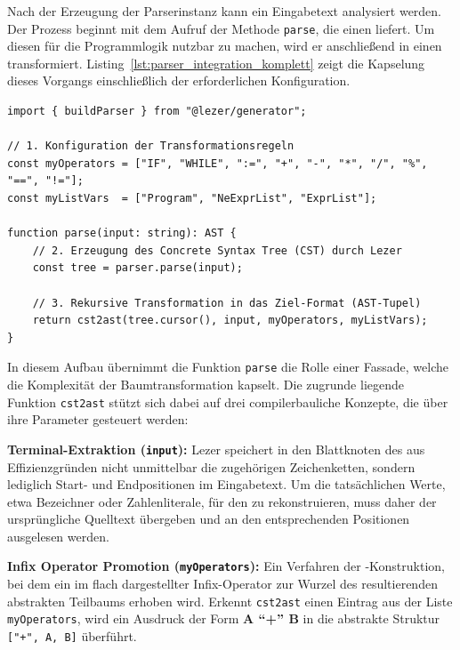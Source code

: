 Nach der Erzeugung der Parserinstanz kann ein Eingabetext analysiert werden. Der Prozess beginnt mit dem Aufruf der Methode \texttt{parse}, die einen  liefert. Um diesen für die Programmlogik nutzbar zu machen, wird er anschließend in einen  transformiert. Listing~\ref{lst:parser_integration_komplett} zeigt die Kapselung dieses Vorgangs einschließlich der erforderlichen Konfiguration.

\begin{listing}[htbp]
    \caption{Vollständige Integrationslogik in TypeScript}
    \label{lst:parser_integration_komplett}
\begin{verbatim}
import { buildParser } from "@lezer/generator";

// 1. Konfiguration der Transformationsregeln
const myOperators = ["IF", "WHILE", ":=", "+", "-", "*", "/", "%", "==", "!="];
const myListVars  = ["Program", "NeExprList", "ExprList"];

function parse(input: string): AST {
    // 2. Erzeugung des Concrete Syntax Tree (CST) durch Lezer
    const tree = parser.parse(input);

    // 3. Rekursive Transformation in das Ziel-Format (AST-Tupel)
    return cst2ast(tree.cursor(), input, myOperators, myListVars);
}
\end{verbatim}
\end{listing}

In diesem Aufbau übernimmt die Funktion \texttt{parse} die Rolle einer Fassade, welche die Komplexität der Baumtransformation kapselt. Die zugrunde liegende Funktion \texttt{cst2ast} stützt sich dabei auf drei compilerbauliche Konzepte, die über ihre Parameter gesteuert werden:

\begin{definition}
\label{def:terminal-extraktion}
\textbf{Terminal-Extraktion (\texttt{input}):}
Lezer speichert in den Blattknoten des  aus Effizienzgründen nicht unmittelbar die zugehörigen Zeichenketten, sondern lediglich Start- und Endpositionen im Eingabetext. Um die tatsächlichen Werte, etwa Bezeichner oder Zahlenliterale, für den  zu rekonstruieren, muss daher der ursprüngliche Quelltext übergeben und an den entsprechenden Positionen ausgelesen werden.
\end{definition}

\begin{definition}
\label{def:infix-promotion}
\textbf{Infix Operator Promotion (\texttt{myOperators}):}
Ein Verfahren der -Konstruktion, bei dem ein im  flach dargestellter Infix-Operator zur Wurzel des resultierenden abstrakten Teilbaums erhoben wird. Erkennt \texttt{cst2ast} einen Eintrag aus der Liste \texttt{myOperators}, wird ein Ausdruck der Form \textbf{A ``+'' B} in die abstrakte Struktur \texttt{["+", A, B]} überführt.
\end{definition}

